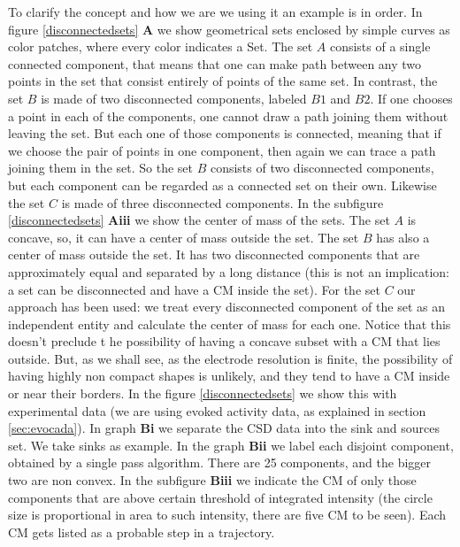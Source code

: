 \documentclass[11pt, letterpaper]{article}
\begin{document}
To clarify the concept and how we are we using it an example is in order. In figure \ref{disconnectedsets} \textbf{A} we show geometrical sets enclosed by simple curves as color patches, where every color indicates a Set. The set $A$ consists of a single connected component, that means that one can make  path between any two points in the set that consist entirely of points of the same set. In contrast, the set $B$ is made of two disconnected components, labeled $B1$ and $B2$. If one chooses a point in each of the components, one cannot draw a path joining them without leaving the set. But each one of those components is connected, meaning that if we choose the pair of points in one component, then again we can trace a path joining them in the set. So the set $B$ consists of two disconnected components, but each component can be regarded as a connected set on their own. Likewise the set $C$ is made of three disconnected components. In the subfigure \ref{disconnectedsets} \textbf{Aiii} we show the center of mass of the sets. The set $A$ is concave, so, it can have a center of mass outside the set. The
set $B$ has also a center of mass outside the set. It has two disconnected components that are approximately
equal and separated by a long distance (this is not an implication: a set can be disconnected and have
a CM inside the set). For the set $C$ our approach has been used: we treat every disconnected component of the
set as an independent entity and calculate the center of mass for each one. Notice that this doesn't preclude t
he possibility of having a concave subset with a CM that lies outside. But, as we shall see,
as the electrode resolution is finite, the possibility of having highly non compact shapes is unlikely, and they
tend to have a CM inside or near their borders. In the figure \ref{disconnectedsets}
 we show this with experimental
data (we are using evoked activity data, as explained in section \ref{sec:evocada}). In graph
\textbf{Bi} we
separate the CSD data into the sink and sources set. We take sinks as example. In the graph
\textbf{Bii}
we label each disjoint component, obtained by a single pass algorithm. There are 25 components, and
the bigger two are non convex. In the
subfigure \textbf{Biii}
we indicate the CM of only those components that are above certain threshold of
integrated intensity (the circle size  is proportional in area to such intensity, there are five CM to be
seen). Each CM gets listed as a probable step in a trajectory.
\end{document}
